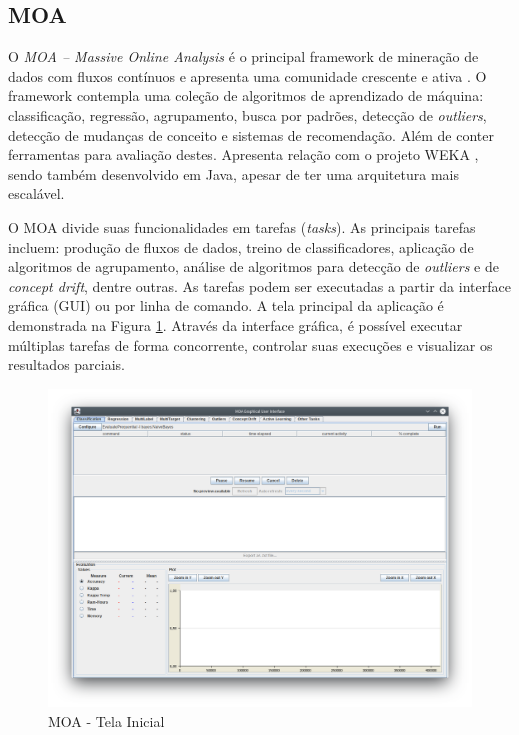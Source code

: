 \documentclass[qual, classic, a4paper]{ufbathesis}
\begin{document}
\subsection{MOA}

O \textit{MOA – Massive Online Analysis} é o principal framework de mineração de dados com fluxos contínuos e apresenta uma comunidade crescente e ativa \cite{Bifet:2010:MMO:1756006.1859903}.
O framework contempla uma coleção de algoritmos de aprendizado de máquina: classificação, regressão, agrupamento, busca por padrões, detecção de \textit{outliers}, detecção de mudanças de conceito e sistemas de recomendação.
Além de conter ferramentas para avaliação destes.
Apresenta relação com o projeto WEKA \cite{Hall:2009:WDM:1656274.1656278}, sendo também desenvolvido em Java, apesar de ter uma arquitetura mais escalável.

O MOA divide suas funcionalidades em tarefas (\textit{tasks}).
As principais tarefas incluem:
produção de fluxos de dados,
treino de classificadores,
aplicação de algoritmos de agrupamento,
análise de algoritmos para detecção de \textit{outliers} e de \textit{concept drift}, dentre outras.
As tarefas podem ser executadas a partir da interface gráfica (GUI) ou por linha de comando.
A tela principal da aplicação é demonstrada na Figura \ref{fig:moa}.
Através da interface gráfica, é possível executar múltiplas tarefas de forma concorrente, 
controlar suas execuções e visualizar os resultados parciais.

\begin{figure}[!ht]
\begin{center}
    \includegraphics[scale=0.5]{imagens/moa.png}
    \caption{MOA - Tela Inicial}
    \label{fig:moa}
\end{center}
\end{figure}
\end{document}
